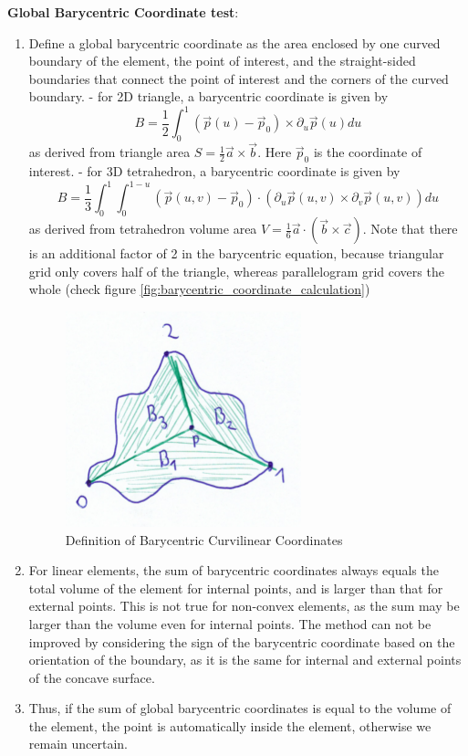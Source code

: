 \documentclass[12pt]{article}
\begin{document}
\noindent
\textbf{Global Barycentric Coordinate test}:
\begin{enumerate}
	\item Define a global barycentric coordinate as the area enclosed by one curved boundary of the element, the point of interest, and the straight-sided boundaries that connect the point of interest and the corners of the curved boundary.
		\subitem - for 2D triangle, a barycentric coordinate is given by
		\[B = \frac{1}{2}\int_0^1 (\vec{p}(u) - \vec{p}_0) \times \partial_u \vec{p}(u) du\]
		as derived from triangle area $S = \frac{1}{2} \vec{a} \times \vec{b}$. Here $\vec{p}_0$ is the coordinate of interest.
		\subitem - for 3D tetrahedron, a barycentric coordinate is given by
		\[B = \frac{1}{3}\int_0^1 \int_0^{1-u} (\vec{p}(u,v) - \vec{p}_0) \cdot (\partial_u \vec{p}(u,v) \times \partial_v \vec{p}(u,v)) du\]
		as derived from tetrahedron volume area $V = \frac{1}{6} \vec{a} \cdot (\vec{b} \times \vec{c})$.
		Note that there is an additional factor of 2 in the barycentric equation, because triangular grid only covers half of the triangle, whereas
		parallelogram grid covers the whole (check figure \ref{fig:barycentric_coordinate_calculation})

\begin{figure}[!htb]
    \centering	
    \includegraphics[scale=0.7]{doc-pics/pic-barycentric-curvilinear-definition.png}
    \caption{Definition of Barycentric Curvilinear Coordinates}
\end{figure}

	\item For linear elements, the sum of barycentric coordinates always equals the total volume of the element for internal points, and is larger than that for external points. This is not true for non-convex elements, as the sum may be larger than the volume even for internal points. The method can not be improved by considering the sign of the barycentric coordinate based on the orientation of the boundary, as it is the same for internal and external points of the concave surface.
	\item Thus, if the sum of global barycentric coordinates is equal to the volume of the element, the point is automatically inside the element, otherwise we remain uncertain.
			
\end{enumerate}
\end{document}

